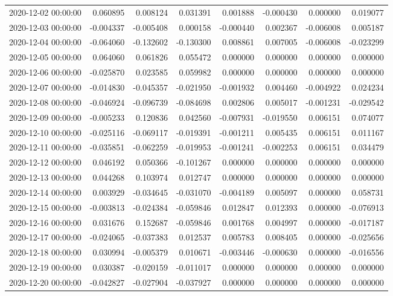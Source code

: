 \begin{tabular}{lrrrrrrr}
2020-12-02 00:00:00 & 0.060895 & 0.008124 & 0.031391 & 0.001888 & -0.000430 & 0.000000 & 0.019077 \\
2020-12-03 00:00:00 & -0.004337 & -0.005408 & 0.000158 & -0.000440 & 0.002367 & -0.006008 & 0.005187 \\
2020-12-04 00:00:00 & -0.064060 & -0.132602 & -0.130300 & 0.008861 & 0.007005 & -0.006008 & -0.023299 \\
2020-12-05 00:00:00 & 0.064060 & 0.061826 & 0.055472 & 0.000000 & 0.000000 & 0.000000 & 0.000000 \\
2020-12-06 00:00:00 & -0.025870 & 0.023585 & 0.059982 & 0.000000 & 0.000000 & 0.000000 & 0.000000 \\
2020-12-07 00:00:00 & -0.014830 & -0.045357 & -0.021950 & -0.001932 & 0.004460 & -0.004922 & 0.024234 \\
2020-12-08 00:00:00 & -0.046924 & -0.096739 & -0.084698 & 0.002806 & 0.005017 & -0.001231 & -0.029542 \\
2020-12-09 00:00:00 & -0.005233 & 0.120836 & 0.042560 & -0.007931 & -0.019550 & 0.006151 & 0.074077 \\
2020-12-10 00:00:00 & -0.025116 & -0.069117 & -0.019391 & -0.001211 & 0.005435 & 0.006151 & 0.011167 \\
2020-12-11 00:00:00 & -0.035851 & -0.062259 & -0.019953 & -0.001241 & -0.002253 & 0.006151 & 0.034479 \\
2020-12-12 00:00:00 & 0.046192 & 0.050366 & -0.101267 & 0.000000 & 0.000000 & 0.000000 & 0.000000 \\
2020-12-13 00:00:00 & 0.044268 & 0.103974 & 0.012747 & 0.000000 & 0.000000 & 0.000000 & 0.000000 \\
2020-12-14 00:00:00 & 0.003929 & -0.034645 & -0.031070 & -0.004189 & 0.005097 & 0.000000 & 0.058731 \\
2020-12-15 00:00:00 & -0.003813 & -0.024384 & -0.059846 & 0.012847 & 0.012393 & 0.000000 & -0.076913 \\
2020-12-16 00:00:00 & 0.031676 & 0.152687 & -0.059846 & 0.001768 & 0.004997 & 0.000000 & -0.017187 \\
2020-12-17 00:00:00 & -0.024065 & -0.037383 & 0.012537 & 0.005783 & 0.008405 & 0.000000 & -0.025656 \\
2020-12-18 00:00:00 & 0.030994 & -0.005379 & 0.010671 & -0.003446 & -0.000630 & 0.000000 & -0.016556 \\
2020-12-19 00:00:00 & 0.030387 & -0.020159 & -0.011017 & 0.000000 & 0.000000 & 0.000000 & 0.000000 \\
2020-12-20 00:00:00 & -0.042827 & -0.027904 & -0.037927 & 0.000000 & 0.000000 & 0.000000 & 0.000000 \\

\end{tabular}
